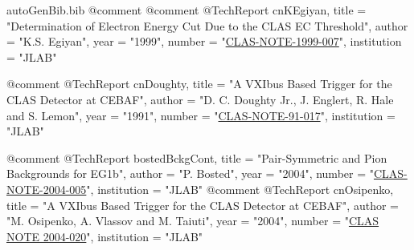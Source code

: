 \begin{filecontents*}{autoGenBib.bib}
@comment %
@comment %
@TechReport{ cnKEgiyan,
	title = "Determination of Electron Energy Cut Due to the CLAS EC Threshold",
	author = "K.S. Egiyan",
	year = "1999",
	number = "\href{http://wwwold.jlab.org/Hall-B/notes/clas\_notes91/note91-017.pdf}{CLAS-NOTE-1999-007}",
	institution = "JLAB"
}

@comment %
@TechReport{ cnDoughty,
	title = "A VXIbus Based Trigger for the CLAS Detector at CEBAF",
	author = "{D. C. Doughty Jr., J. Englert, R. Hale and S. Lemon}",
	year = "1991",
	number = "\href{http://wwwold.jlab.org/Hall-B/notes/clas\_notes91/note91-017.pdf}{CLAS-NOTE-91-017}",
	institution = "JLAB"
}

@comment %
@TechReport{ bostedBckgCont,
	title = "Pair-Symmetric and Pion Backgrounds for EG1b",
	author = "{P. Bosted}",
	year = "2004",
	number = "\href{http://www.jlab.org/Hall-B/notes/clas\_notes04/2004-005.ps}{CLAS-NOTE-2004-005}",
	institution = "JLAB"
}
@comment %
@TechReport{ cnOsipenko,
	title = "A VXIbus Based Trigger for the CLAS Detector at CEBAF",
	author = "{M. Osipenko, A. Vlassov and M. Taiuti}",
	year = "2004",
	number = "\href{http://www.jlab.org/Hall-B/notes/clas_notes04/2004-020.pdf}{CLAS NOTE 2004-020}",
	institution = "JLAB"
}




\end{filecontents*}
